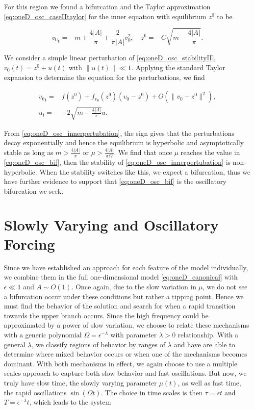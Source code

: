 For this region we found a bifurcation and the Taylor approximation \eqref{eq:oneD_osc_caseIItaylor} for the inner equation with equilibrium $z^0$ to be

\begin{equation}\label{eq:oneD_osc_stabilityII}
{v_0}_t= -m +\frac{4|A|}{\pi}+\frac{2}{\pi |A|}v_0^2,\quad z^0=-C \sqrt{m-\frac{4|A|}{\pi}}.
\end{equation}

We consider a simple linear perturbation of \eqref{eq:oneD_osc_stabilityII}, $v_0(t)=z^0+u(t)$ with $\lVert u(t) \rVert \ll 1$. Applying the standard Taylor expansion to determine the equation for the perturbations, we find

\begin{equation}\label{eq:oneD_osc_innerpertubation}
\begin{aligned}
{v_0}_t =& f(z^0)+f_{v_0}(z^0)(v_0-z^0)+ O(\lVert v_0-z^0\rVert^2),\\ 
u_t =& -2\sqrt{m-\frac{4|A|}{\pi}} u .
\end{aligned}
\end{equation}

From \eqref{eq:oneD_osc_innerpertubation}, the sign gives that the perturbations decay exponentially and hence the equilibrium is hyperbolic and asymptotically stable as long as $m>\frac{4|A|}{\pi}$ or $\mu>\frac{4|A|}{\pi \Omega}$. We find that once $\mu$ reaches the value in \eqref{eq:oneD_osc_bif}, then the stability of \eqref{eq:oneD_osc_innerpertubation} is non-hyperbolic. When the stability switches like this, we expect a bifurcation, thus we have further evidence to support that \eqref{eq:oneD_osc_bif} is the oscillatory bifurcation we seek.

\section{Slowly Varying and Oscillatory Forcing}
\label{sec:oneD_slowosc}

Since we have established an approach for each feature of the model individually, we combine them in the full one-dimensional model \eqref{eq:oneD_canonical} with $\epsilon\ll 1$ and ${A\sim O(1)}$. Once again, due to the slow variation in $\mu$, we do not see a bifurcation occur under these conditions but rather a tipping point. Hence we must find the behavior of the solution and search for when a rapid transition towards the upper branch occurs. Since the high frequency could be approximated by a power of slow variation, we choose to relate these mechanisms with a generic polynomial $\Omega = \epsilon^{-\lambda}$ with parameter $\lambda>0$ relationship. With a general $\lambda$, we classify regions of behavior by ranges of $\lambda$ and have are able to determine where mixed behavior occurs or when one of the mechanisms becomes dominant. With both mechanisms in effect, we again choose to use a multiple scales approach to capture both slow behavior and fast oscillations. But now, we truly have slow time, the slowly varying parameter $\mu(t)$, as well as fast time, the rapid oscillations $\sin(\Omega t)$. The choice in time scales is then $\tau=\epsilon t$ and $T=\epsilon^{-\lambda} t$, which leads to the system

